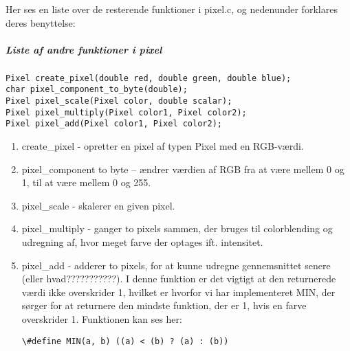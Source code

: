 Her ses en liste over de resterende funktioner i pixel.c, og nedenunder forklares deres benyttelse:

\subparagraph{Liste af andre funktioner i pixel}
\begin{lstlisting}[style=Cstyle, caption=Andre funktioner i pixel]
Pixel create_pixel(double red, double green, double blue);
char pixel_component_to_byte(double);
Pixel pixel_scale(Pixel color, double scalar);
Pixel pixel_multiply(Pixel color1, Pixel color2);
Pixel pixel_add(Pixel color1, Pixel color2);
\end{lstlisting}

\begin{enumerate}

  \item create\_pixel - opretter en pixel af typen Pixel med en RGB-værdi.
  \item pixel\_component to byte – ændrer værdien af RGB fra at være mellem 0 og 1, til at være mellem 0 og 255.
  \item pixel\_scale - skalerer en given pixel.
  \item pixel\_multiply - ganger to pixels sammen, der bruges til colorblending og udregning af, hvor meget farve der optages 								  ift. intensitet.
  \item pixel\_add - adderer to pixels, for at kunne udregne gennemsnittet senere (eller hvad???????????). I denne funktion er 							 det vigtigt at den returnerede værdi ikke overskrider 1, hvilket er hvorfor vi har implementeret MIN, der 							 sørger for at returnere den mindste funktion, der er 1, hvis en farve overskrider 1. Funktionen kan ses her:
  
 \lstinline$\#define MIN(a, b) ((a) < (b) ? (a) : (b))$  					
 
\end{enumerate}

